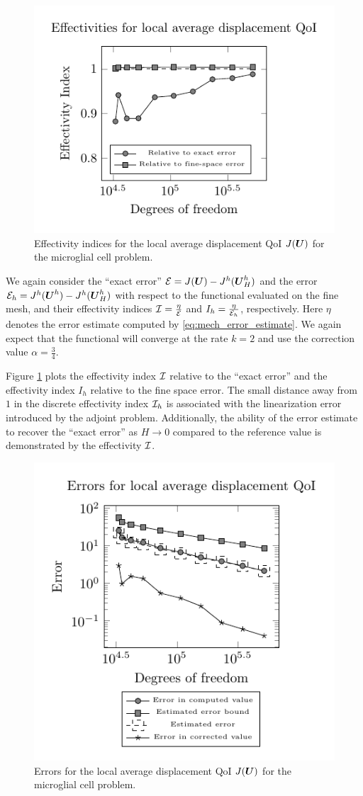 \begin{figure}[ht!]
\centering
\includegraphics[width=.5\linewidth]{img/mech_glial_effectivity_plot.pdf}
\caption{Effectivity indices for the local average displacement QoI
$J(\boldsymbol{U})$ for the microglial cell problem.}
\label{fig:mech_glial_effectivity}
\end{figure}

We again consider the ``exact error'' $\mathcal{E} = J(\boldsymbol{U}) - J^h(\boldsymbol{U}^h_H)$ and
the error $\mathcal{E}_h = J^h(\boldsymbol{U}^h) - J^h(\boldsymbol{U}^h_H)$ with respect to the
functional evaluated on the fine mesh, and their effectivity indices
$\mathcal{I} = \frac{\eta}{\mathcal{E}}$ and $I_h = \frac{\eta}{\mathcal{E}_h}$, respectively. Here
$\eta$ denotes the error estimate computed by \eqref{eq:mech_error_estimate}.
We again expect that the functional will converge at the rate $k = 2$ and use
the correction value $\alpha = \frac34$.

Figure \ref{fig:mech_glial_effectivity} plots the effectivity index $\mathcal{I}$
relative to the ``exact error'' and the effectivity index $I_h$ relative to the
fine space error. The small distance away from $1$ in the discrete effectivity
index $\mathcal{I}_h$ is associated with the linearization error introduced by the
adjoint problem. Additionally, the ability of the error estimate to recover
the ``exact error'' as $H \to 0$ compared to the reference value is
demonstrated by the effectivity $\mathcal{I}$.

\begin{figure}[ht!]
\centering
\includegraphics[width=.5\linewidth]{img/mech_glial_error_plot.pdf}
\caption{Errors for the local average displacement QoI $J(\boldsymbol{U})$ for the
microglial cell problem.}
\label{fig:mech_glial_error}
\end{figure}

